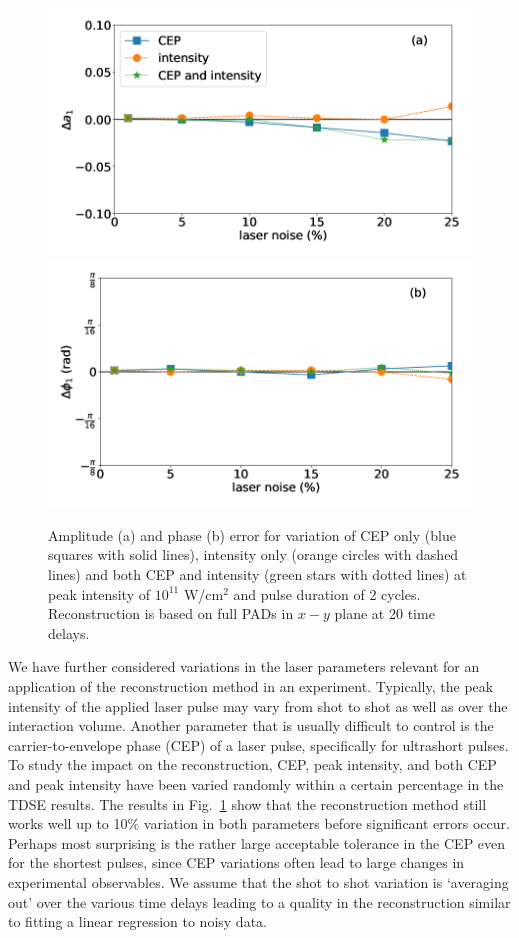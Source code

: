 \begin{figure}[!ht]
\centering
\includegraphics[width=0.49\linewidth]{figs/Photo_ionization/superpositions/Venzke_new_fig_9a.png}
\includegraphics[width=0.49\linewidth]{figs/Photo_ionization/superpositions/Venzke_new_fig_9b.png}
\caption{
Amplitude (a) and phase (b) error for variation of CEP only (blue squares with solid lines), intensity only (orange circles with dashed lines) and both CEP and intensity (green stars with dotted lines)
at peak intensity of  $10^{11}$ W/cm$^2$ and pulse duration of 2 cycles.  Reconstruction is based on full PADs in $x-y$ plane at 20 time delays.
} 
  \label{fig:noise}
\end{figure}

We have further considered variations in the laser parameters relevant for an application of the reconstruction method in an experiment. Typically, the peak intensity of the applied laser pulse may vary from shot to shot as well as over the interaction volume. Another parameter that is usually difficult to control is the carrier-to-envelope phase (CEP) of a laser pulse, specifically for ultrashort pulses. To study the impact on the reconstruction, CEP, peak intensity, and both CEP and peak intensity have been varied randomly within a certain percentage in the TDSE results. The results in Fig.~\ref{fig:noise} show that the reconstruction method still works well up to 10\% variation in both parameters before significant errors occur. Perhaps most surprising is the rather large acceptable tolerance in the CEP even for the shortest pulses, since CEP variations often lead to large changes in experimental observables. We assume that the shot to shot variation is `averaging out' over the various time delays leading to a quality in the reconstruction similar to fitting a linear regression to noisy data.

